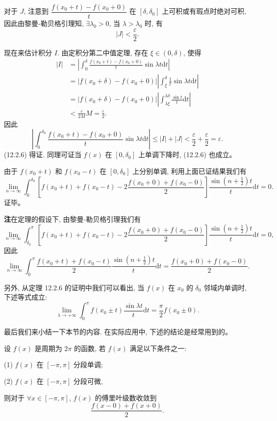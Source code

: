 \documentclass[UTF8, 12pt, fontset=fandol, oneside]{ctexart}
\begin{document}
对于 $J$, 注意到 $\dfrac{f(x_0+t)-f(x_0+0)}{t}$ 在 $[\delta,\delta_0]$ 上可积或有瑕点时绝对可积, 因此由黎曼-勒贝格引理知, $\exists\lambda_0>0$, 当 $\lambda>\lambda_0$ 时, 有
\[
  |J|<\frac{\varepsilon}{2}.
\]

现在来估计积分 $I$. 由定积分第二中值定理, 存在 $\xi\in(0,\delta)$, 使得
\[
\begin{aligned}
  |I|
  &=
  \left|\int_0^\delta\frac{f(x_0+t)-f(x_0+0)}{t}\sin\lambda t\mathrm dt\right|\\
  &=
  |f(x_0+\delta)-f(x_0+0)|
  \left|\int_\xi^\delta\frac1t\sin\lambda t\mathrm dt\right|\\
  &=
  |f(x_0+\delta)-f(x_0+0)|
  \left|\int_{\lambda\xi}^{\lambda\delta}\frac{\sin t}{t}\mathrm dt\right|\\
  &<
  \frac{\varepsilon}{2M}M=\frac{\varepsilon}{2}.
\end{aligned}
\]
因此
\[
  \left|\int_0^{\delta_0}\frac{f(x_0+t)-f(x_0+0)}{t}\sin\lambda t\mathrm dt\right|
  \leqslant |I|+|J|<\frac{\varepsilon}{2}+\frac{\varepsilon}{2}=\varepsilon.
\]
(12.2.6) 得证. 同理可证当 $f(x)$ 在 $[0,\delta_0]$ 上单调下降时, (12.2.6) 也成立。

由于 $f(x_0+t)$ 和 $f(x_0-t)$ 在 $[0,\delta_0]$ 上分别单调, 利用上面已证结果我们有
\[
  \lim_{n\to\infty}\int_0^{\delta_0}
  \left[
    f(x_0+t)+f(x_0-t)-2\frac{f(x_0+0)+f(x_0-0)}{2}
  \right]
  \frac{\sin\left(n+\frac12\right)t}{t}\mathrm dt=0.
\]
证毕。

\noindent\textbf{注}\quad 在定理的假设下, 由黎曼-勒贝格引理我们有
\[
  \lim_{n\to\infty}\int_{\delta_0}^\pi
  \left[
    f(x_0+t)+f(x_0-t)-2\frac{f(x_0+0)+f(x_0-0)}{2}
  \right]
  \frac{\sin\left(n+\frac12\right)t}{t}\mathrm dt=0,
\]
因此
\[
  \lim_{n\to\infty}\int_0^\pi
  \frac{f(x_0+t)+f(x_0-t)}{2}
  \frac{\sin\left(n+\frac12\right)t}{t}\mathrm dt
  =
  \frac{f(x_0+0)+f(x_0-0)}{2}.
\]

另外, 从定理 12.2.6 的证明中我们可以看出, 当 $f(x)$ 在 $x_0$ 的 $\delta_0$ 邻域内单调时, 下述等式成立:
\[
  \lim_{\lambda\to+\infty}\int_0^\pi f(x_0\pm t)\frac{\sin\lambda t}{t}\mathrm dt
  =\frac{\pi}{2}f(x_0\pm0).
\]

最后我们来小结一下本节的内容. 在实际应用中, 下述的结论是经常用到的。

设 $f(x)$ 是周期为 $2\pi$ 的函数, 若 $f(x)$ 满足以下条件之一:

(1) $f(x)$ 在 $[-\pi,\pi]$ 分段单调;

(2) $f(x)$ 在 $[-\pi,\pi]$ 分段可微,

则对于 $\forall x\in[-\pi,\pi]$, $f(x)$ 的傅里叶级数收敛到
\[
  \frac{f(x-0)+f(x+0)}{2}.
\]
\end{document}
